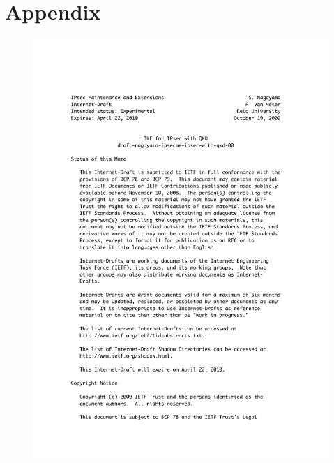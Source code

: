 \chapter{Appendix}
\label{allendix}
\begin{figure}[h]
\begin{center}
\includegraphics[width=400pt]{figure/draft.pdf}
\label{draft}
\end{center}
\end{figure}

